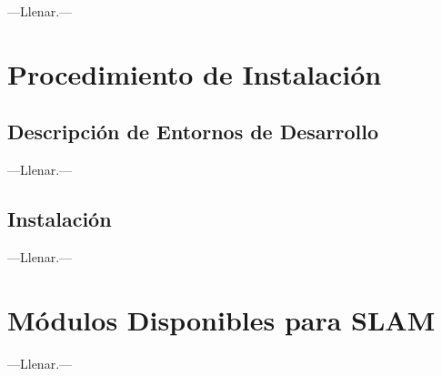 ---Llenar.---

\section{Procedimiento de Instalación}

\subsection{Descripción de Entornos de Desarrollo}

---Llenar.---

\subsection{Instalación}

---Llenar.---

\section{Módulos Disponibles para SLAM}

---Llenar.---
